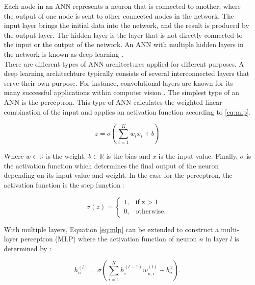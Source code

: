 Each node in an ANN represents a neuron that is connected to another, where the output of one node is sent to other connected nodes in the network. 
The input layer brings the initial data into the network, and the result is produced by the output layer. The hidden layer is the layer that is not directly connected to the input or the output of the network. An ANN with multiple hidden layers in the network is known as deep learning \cite{nielsen}. 
\\
There are different types of ANN architectures applied for different purposes. A deep learning architechture typically consists of several interconnected layers that serve their own purpose. For instance, convolutional layers are known for its many successful applications within computer vision \cite{goodfellow}. 
The simplest type of an ANN is the perceptron. This type of ANN calculates the weighted linear combination of the input and applies an activation function according to \ref{eq:mlp}.
 
\begin{equation} \label{eq:mlp}
    z = \sigma(\sum_{i=1}^{K} {w_{i}x_{i}} + b)
\end{equation}

Where $w \in \mathbb{R}$ is the weight, $b \in \mathbb{R}$ is the bias and $x$ is the input value. Finally, $\sigma$ is the activation function which determines the final output of the neuron depending on its input value and weight. In the case for the perceptron, the activation function is the step function :

\begin{equation} \label{eq:step}
    \sigma(z) =
    \begin{cases}
        1, & \text{if z > 1} \\
        0, & \text{otherwise}.
    \end{cases}
\end{equation}

With multiple layers, Equation \ref{eq:mlp} can be extended to construct a multi-layer perceptron (MLP) where the activation function of neuron $n$ in layer $l$ is determined by \cite{nielsen}:

\begin{equation}\label{eq:mlp2}
    h_{n}^{(l)} = \sigma(\sum_{i=1}^{K} {h_{i}^{(l-1)}w_{n,i}^{(l)} + b_{n}^{(l}}).
\end{equation}


